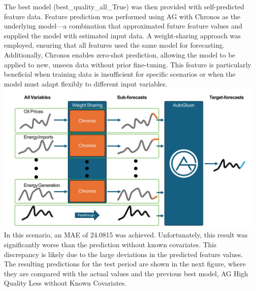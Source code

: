 \documentclass[a4paper]{article}
\begin{document}
    The best model (best\_quality\_all\_True) was then provided with
self-predicted feature data. Feature prediction was performed using AG
with Chronos as the underlying model---a combination that approximated
future feature values and supplied the model with estimated input data.
A weight-sharing approach was employed, ensuring that all features used
the same model for forecasting. Additionally, Chronos enables zero-shot
prediction, allowing the model to be applied to new, unseen data without
prior fine-tuning. This feature is particularly beneficial when training
data is insufficient for specific scenarios or when the model must adapt
flexibly to different input variables.
{\includegraphics[keepaspectratio]{src/AG-Ensemble2.pdf}}
In this scenario, an MAE of 24.0815 was achieved. Unfortunately, this
result was significantly worse than the prediction without known
covariates. This discrepancy is likely due to the large deviations in
the predicted feature values. The resulting predictions for the test
period are shown in the next figure, where they are compared with the
actual values and the previous best model, AG High Quality Less without
Known Covariates.
\end{document}
